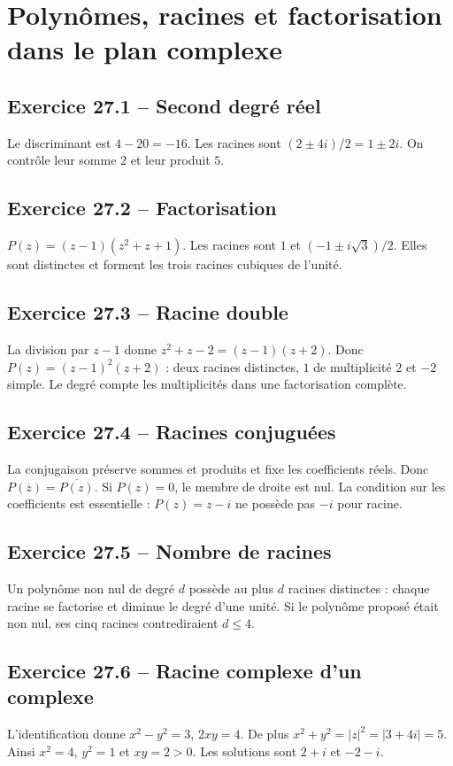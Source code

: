\chapter{Polynômes, racines et factorisation dans le plan complexe}
\section*{Exercice 27.1 -- Second degré réel}
Le discriminant est $4-20=-16$. Les racines sont $(2\pm4i)/2=1\pm2i$. On contrôle leur somme $2$ et leur produit $5$.

\section*{Exercice 27.2 -- Factorisation}
$P(z)=(z-1)(z^2+z+1)$. Les racines sont $1$ et $(-1\pm i\sqrt3)/2$. Elles sont distinctes et forment les trois racines cubiques de l'unité.

\section*{Exercice 27.3 -- Racine double}
La division par $z-1$ donne $z^2+z-2=(z-1)(z+2)$. Donc $P(z)=(z-1)^2(z+2)$ : deux racines distinctes, $1$ de multiplicité $2$ et $-2$ simple. Le degré compte les multiplicités dans une factorisation complète.

\section*{Exercice 27.4 -- Racines conjuguées}
La conjugaison préserve sommes et produits et fixe les coefficients réels. Donc $P(\overline z)=\overline{P(z)}$. Si $P(z)=0$, le membre de droite est nul. La condition sur les coefficients est essentielle : $P(z)=z-i$ ne possède pas $-i$ pour racine.

\section*{Exercice 27.5 -- Nombre de racines}
Un polynôme non nul de degré $d$ possède au plus $d$ racines distinctes : chaque racine se factorise et diminue le degré d'une unité. Si le polynôme proposé était non nul, ses cinq racines contrediraient $d\le4$.

\section*{Exercice 27.6 -- Racine complexe d’un complexe}
L'identification donne $x^2-y^2=3$, $2xy=4$. De plus $x^2+y^2=|z|^2=|3+4i|=5$. Ainsi $x^2=4$, $y^2=1$ et $xy=2>0$. Les solutions sont $2+i$ et $-2-i$.
